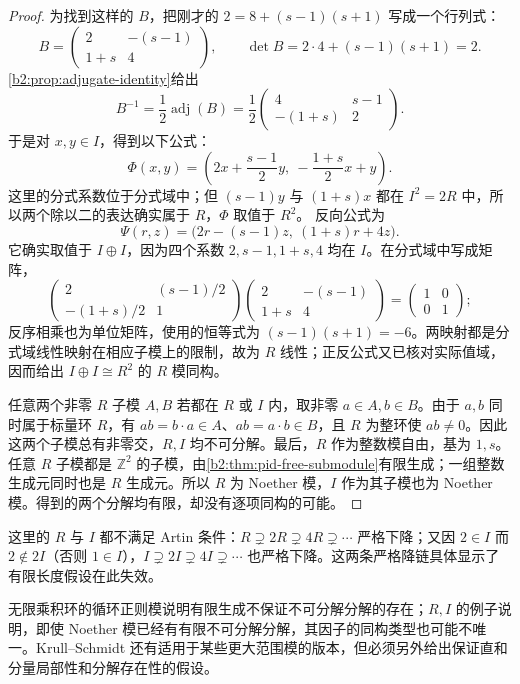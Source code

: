 \begin{proof}
	为找到这样的 \(B\)，把刚才的 \(2=8+(s-1)(s+1)\) 写成一个行列式：
	\[
		B=\begin{pmatrix}2&-(s-1)\\1+s&4\end{pmatrix},\qquad
		\det B=2\cdot4+(s-1)(s+1)=2.
	\]
	\cref{b2:prop:adjugate-identity}给出
	\[
		B^{-1}=\frac12\operatorname{adj}(B)
		=\frac12\begin{pmatrix}4&s-1\\-(1+s)&2\end{pmatrix}.
	\]
	于是对 \(x,y\in I\)，得到以下公式：
	\[
		\Phi(x,y)= \left(2x+\frac{s-1}{2}y,\ -\frac{1+s}{2}x+y\right).
	\]
	这里的分式系数位于分式域中；但 \((s-1)y\) 与 \((1+s)x\) 都在 \(I^2=2R\) 中，所以两个除以二的表达确实属于 \(R\)，\(\Phi\) 取值于 \(R^2\)。 反向公式为
	\[
		\Psi(r,z)=\bigl(2r-(s-1)z,\ (1+s)r+4z\bigr).
	\]
	它确实取值于 \(I\oplus I\)，因为四个系数 \(2,s-1,1+s,4\) 均在 \(I\)。在分式域中写成矩阵，
	\[
		\begin{pmatrix}2&(s-1)/2\\-(1+s)/2&1\end{pmatrix}
		\begin{pmatrix}2&-(s-1)\\1+s&4\end{pmatrix}
		=\begin{pmatrix}1&0\\0&1\end{pmatrix};
	\]
	反序相乘也为单位矩阵，使用的恒等式为 \((s-1)(s+1)=-6\)。两映射都是分式域线性映射在相应子模上的限制，故为 \(R\) 线性；正反公式又已核对实际值域，因而给出 \(I\oplus I\cong R^2\) 的 \(R\) 模同构。

	任意两个非零 \(R\) 子模 \(A,B\) 若都在 \(R\) 或 \(I\) 内，取非零 \(a\in A,b\in B\)。由于 \(a,b\) 同时属于标量环 \(R\)，有 \(ab=b\cdot a\in A\)、\(ab=a\cdot b\in B\)，且 \(R\) 为整环使 \(ab\ne0\)。因此这两个子模总有非零交，\(R,I\) 均不可分解。最后，\(R\) 作为整数模自由，基为 \(1,s\)。任意 \(R\) 子模都是 \(\mathbb Z^2\) 的子模，由\cref{b2:thm:pid-free-submodule}有限生成；一组整数生成元同时也是 \(R\) 生成元。所以 \(R\) 为 Noether 模，\(I\) 作为其子模也为 Noether 模。得到的两个分解均有限，却没有逐项同构的可能。
\end{proof}

这里的 \(R\) 与 \(I\) 都不满足 Artin 条件：\(R\supsetneq2R\supsetneq4R\supsetneq\cdots\) 严格下降；又因 \(2\in I\) 而 \(2\notin2I\)（否则 \(1\in I\)），\(I\supsetneq2I\supsetneq4I\supsetneq\cdots\) 也严格下降。这两条严格降链具体显示了有限长度假设在此失效。

\ProseParagraphBreak

无限乘积环的循环正则模说明有限生成不保证不可分解分解的存在；\(R,I\) 的例子说明，即使 Noether 模已经有有限不可分解分解，其因子的同构类型也可能不唯一。Krull–Schmidt 还有适用于某些更大范围模的版本，但必须另外给出保证直和分量局部性和分解存在性的假设。
